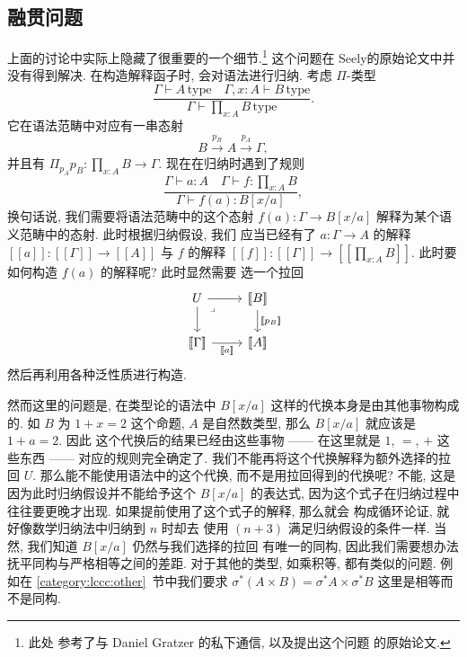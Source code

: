 \subsection{融贯问题}

上面的讨论中实际上隐藏了很重要的一个细节.\footnote{此处
参考了与 Daniel Gratzer 的私下通信, 以及提出这个问题
的原始论文\cite{hofmann:1995:lccccoh}.} 这个问题在
Seely的原始论文中并没有得到解决.
在构造解释函子时, 会对语法进行归纳.
考虑 \(\Pi\)-类型
\[\frac{\Gamma \vdash A\,\text{type}
\quad \Gamma, x{:}A \vdash B\,\text{type} }
{\Gamma \vdash \prod_{x:A} B \,\text{type}}.\]
它在语法范畴中对应有一串态射
\[B \xrightarrow{p_B} A \xrightarrow{p_A} \Gamma,\]
并且有 \(\Pi_{p_A} p_B : \prod_{x:A}B \to \Gamma\).
现在在归纳时遇到了规则
\[\frac{\Gamma \vdash a : A
\quad \Gamma \vdash f : \prod_{x:A}B}
{\Gamma \vdash f(a) : B[x/a]},\]
换句话说, 我们需要将语法范畴中的这个态射
\(f(a) : \Gamma \to B[x/a]\)
解释为某个语义范畴中的态射. 此时根据归纳假设, 我们
应当已经有了 \(a : \Gamma \to A\) 的解释
\([\![a]\!] : [\![\Gamma]\!] \to [\![A]\!]\)
与 \(f\) 的解释
\([\![f]\!] : [\![\Gamma]\!] \to [\![\prod_{x:A} B]\!]\).
此时要如何构造 \(f(a)\) 的解释呢? 此时显然需要
选一个拉回
\[\begin{tikzcd}
  U & {[\![B]\!]} \\
  {[\![\Gamma]\!]} & {[\![A]\!]}
  \arrow["{[\![a]\!]}"', from=2-1, to=2-2]
  \arrow["{[\![p_B]\!]}", from=1-2, to=2-2]
  \arrow[from=1-1, to=2-1]
  \arrow[from=1-1, to=1-2]
  \arrow["\lrcorner"{anchor=center, pos=0.125}, draw=none, from=1-1, to=2-2]
\end{tikzcd}\]
然后再利用各种泛性质进行构造.

然而这里的问题是, 在类型论的语法中 \(B[x/a]\)
这样的代换本身是由其他事物构成的. 如 \(B\) 为
\(1 + x = 2\) 这个命题, \(A\) 是自然数类型,
那么 \(B[x/a]\) 就应该是 \(1 + a = 2\). 因此
这个代换后的结果已经由这些事物 ------ 在这里就是
\(1\), \(=\), \(+\) 这些东西 ------ 对应的规则完全确定了.
我们不能再将这个代换解释为额外选择的拉回 \(U\).
那么能不能使用语法中的这个代换, 而不是用拉回得到的代换呢?
不能, 这是因为此时归纳假设并不能给予这个 \(B[x/a]\)
的表达式, 因为这个式子在归纳过程中往往要更晚才出现.
如果提前使用了这个式子的解释, 那么就会
构成循环论证, 就好像数学归纳法中归纳到 \(n\) 时却去
使用 \((n+3)\) 满足归纳假设的条件一样.
当然, 我们知道 \(B[x/a]\) 仍然与我们选择的拉回
有唯一的同构, 因此我们需要想办法抚平同构与严格相等之间的差距.
对于其他的类型, 如乘积等, 都有类似的问题.
例如在 \ref{category:lccc:other}~节中我们要求
\(\sigma^*(A \times B) = \sigma^* A \times \sigma^* B\)
这里是相等而不是同构.

